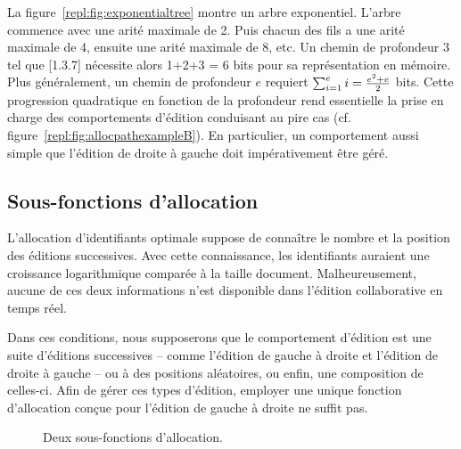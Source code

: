 La figure~\ref{repl:fig:exponentialtree} montre un arbre exponentiel. L'arbre
commence avec une arité maximale de 2. Puis chacun des fils a une arité maximale
de 4, ensuite une arité maximale de 8, etc. Un chemin de profondeur 3 tel que
[1.3.7] nécessite alors 1+2+3 = 6 bits pour sa représentation en mémoire.  Plus
généralement, un chemin de profondeur $e$ requiert
$\textstyle\sum\nolimits_{i=1}^{e}i = {e^2 + e \over{2}}$ bits. Cette
progression quadratique en fonction de la profondeur rend essentielle la prise
en charge des comportements d'édition conduisant au pire cas
(cf. figure~\ref{repl:fig:allocpathexampleB}). En particulier, un comportement
aussi simple que l'édition de droite à gauche doit impérativement être géré.

\subsection{Sous-fonctions d'allocation}
\label{repl:subsec:suballocation}

L'allocation d'identifiants optimale suppose de connaître le nombre et la
position des éditions successives. Avec cette connaissance, les identifiants
auraient une croissance logarithmique comparée à la taille
document. Malheureusement, aucune de ces deux informations n'est disponible dans
l'édition collaborative en temps réel.

Dans ces conditions, nous supposerons que le comportement d'édition est une
suite d'éditions successives -- comme l'édition de gauche à droite et l'édition
de droite à gauche -- ou à des positions aléatoires, ou enfin, une composition
de celles-ci. Afin de gérer ces types d'édition, employer une unique fonction
d'allocation conçue pour l'édition de gauche à droite ne suffit pas.

\begin{figure}
  \begin{center}
    \hspace{20pt}
    \caption[Deux sous-fonctions d'allocation]
    {\label{repl:fig:suballocation}Deux sous-fonctions d'allocation.}
  \end{center}
\end{figure}

